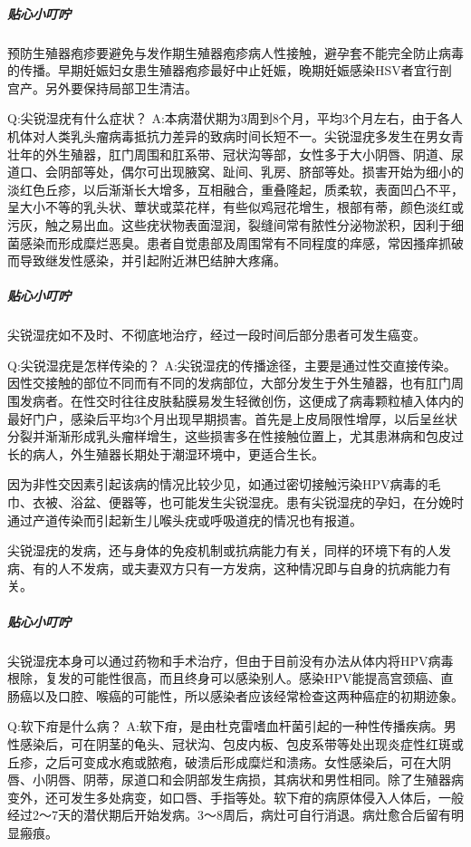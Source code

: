 \documentclass[12pt,UTF8]{ctexbook}
\begin{document}
\subparagraph{贴心小叮咛}

预防生殖器疱疹要避免与发作期生殖器疱疹病人性接触，避孕套不能完全防止病毒的传播。早期妊娠妇女患生殖器疱疹最好中止妊娠，晚期妊娠感染HSV者宜行剖宫产。另外要保持局部卫生清洁。

Q:尖锐湿疣有什么症状？
A:本病潜伏期为3周到8个月，平均3个月左右，由于各人机体对人类乳头瘤病毒抵抗力差异的致病时间长短不一。尖锐湿疣多发生在男女青壮年的外生殖器，肛门周围和肛系带、冠状沟等部，女性多于大小阴唇、阴道、尿道口、会阴部等处，偶尔可出现腋窝、趾间、乳房、脐部等处。损害开始为细小的淡红色丘疹，以后渐渐长大增多，互相融合，重叠隆起，质柔软，表面凹凸不平，呈大小不等的乳头状、蕈状或菜花样，有些似鸡冠花增生，根部有蒂，颜色淡红或污灰，触之易出血。这些疣状物表面湿润，裂缝间常有脓性分泌物淤积，因利于细菌感染而形成糜烂恶臭。患者自觉患部及周围常有不同程度的痒感，常因搔痒抓破而导致继发性感染，并引起附近淋巴结肿大疼痛。

\subparagraph{贴心小叮咛}

尖锐湿疣如不及时、不彻底地治疗，经过一段时间后部分患者可发生癌变。

Q:尖锐湿疣是怎样传染的？
A:尖锐湿疣的传播途径，主要是通过性交直接传染。因性交接触的部位不同而有不同的发病部位，大部分发生于外生殖器，也有肛门周围发病者。在性交时往往皮肤黏膜易发生轻微创伤，这便成了病毒颗粒植入体内的最好门户，感染后平均3个月出现早期损害。首先是上皮局限性增厚，以后呈丝状分裂并渐渐形成乳头瘤样增生，这些损害多在性接触位置上，尤其患淋病和包皮过长的病人，外生殖器长期处于潮湿环境中，更适合生长。

因为非性交因素引起该病的情况比较少见，如通过密切接触污染HPV病毒的毛巾、衣被、浴盆、便器等，也可能发生尖锐湿疣。患有尖锐湿疣的孕妇，在分娩时通过产道传染而引起新生儿喉头疣或呼吸道疣的情况也有报道。

尖锐湿疣的发病，还与身体的免疫机制或抗病能力有关，同样的环境下有的人发病、有的人不发病，或夫妻双方只有一方发病，这种情况即与自身的抗病能力有关。

\subparagraph{贴心小叮咛}

尖锐湿疣本身可以通过药物和手术治疗，但由于目前没有办法从体内将HPV病毒根除，复发的可能性很高，而且终身可以感染别人。感染HPV能提高宫颈癌、直肠癌以及口腔、喉癌的可能性，所以感染者应该经常检查这两种癌症的初期迹象。

Q:软下疳是什么病？
A:软下疳，是由杜克雷嗜血杆菌引起的一种性传播疾病。男性感染后，可在阴茎的龟头、冠状沟、包皮内板、包皮系带等处出现炎症性红斑或丘疹，之后可变成水疱或脓疱，破溃后形成糜烂和溃疡。女性感染后，可在大阴唇、小阴唇、阴蒂，尿道口和会阴部发生病损，其病状和男性相同。除了生殖器病变外，还可发生多处病变，如口唇、手指等处。软下疳的病原体侵入人体后，一般经过2～7天的潜伏期后开始发病。3～8周后，病灶可自行消退。病灶愈合后留有明显瘢痕。
\end{document}
